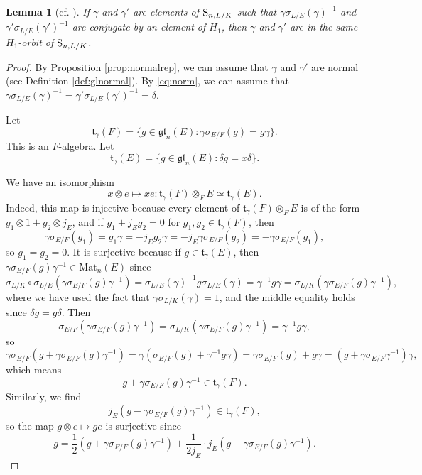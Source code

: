 \documentclass[11pt, reqno]{amsart}
\numberwithin{equation}{subsection}
\theoremstyle{plain}
\newtheorem{lem}[proposition]{Lemma}
\theoremstyle{definition}
\newcommand{\gl}{\mathfrak{gl}}
\renewcommand{\S}{\textnormal{S}}
\begin{document}
\begin{lem}[cf. {\cite[Lemma~1.1(ii)]{Arthur-Clozel}}]
\label{lem:injnorm}
If $\gamma$ and $\gamma'$ are elements of $\S_{n, L/K}$ such that
$\gamma\sigma_{L/E}(\gamma)^{-1}$ and $\gamma'\sigma_{L/E}(\gamma')^{-1}$ are conjugate
by an element of $H_1$, 
then $\gamma$ and $\gamma'$ are in the same $H_1$-orbit
of $\S_{n,L/K}$.
\end{lem}
\begin{proof}

By Proposition \ref{prop:normalrep},
we can assume that $\gamma$ and $\gamma'$ are normal
(see Definition \ref{def:glnormal}).
By \eqref{eq:norm}, 
we can assume that $\gamma\sigma_{L/E}(\gamma)^{-1}
= \gamma'\sigma_{L/E}(\gamma')^{-1} = \delta$.

Let
\[
    \mathfrak t_\gamma(F) = \{g \in \gl_n(E) :
    \gamma \sigma_{E/F}(g) = g\gamma\}.
\]
This is an $F$-algebra. Let 
\[
    \mathfrak t_\gamma(E) = \{g \in \gl_n(E) :
    \delta g = x \delta \}.
\]

We have an isomorphism
\[
    x \otimes e \mapsto xe\colon  \mathfrak t_\gamma(F)
\otimes_F E \simeq \mathfrak t_\gamma(E).
\]
Indeed, this map is injective because every element
of $\mathfrak t_\gamma(F) \otimes_F E$ is of the
form $g_1 \otimes 1 + g_2 \otimes j_E$, and if
$g_1 + j_Eg_2 = 0$ for 
$g_1, g_2 \in \mathfrak t_\gamma(F)$, then
\[
    \gamma\sigma_{E/F}(g_1)
    = g_1\gamma 
    = -j_Eg_2 \gamma
    = -j_E\gamma\sigma_{E/F}(g_2)
    = - \gamma\sigma_{E/F}(g_1),
\]
so $g_1 = g_2 = 0$.
It is surjective because 
if $g \in \mathfrak t_\gamma(E)$, then
$\gamma \sigma_{E/F}(g) \gamma^{-1} \in \mathrm{Mat}_n(E)$
since
\[
    \sigma_{L/K} \circ \sigma_{L/E}(\gamma \sigma_{E/F}(g) \gamma^{-1})
    = \sigma_{L/E}(\gamma)^{-1} g
    \sigma_{L/E}(\gamma) = \gamma^{-1} g \gamma
    = \sigma_{L/K}(\gamma \sigma_{E/F}(g) \gamma^{-1}),
\]
where we have used the fact that 
$\gamma\sigma_{L/K}(\gamma) = 1$,
and the middle equality holds since $\delta g = g\delta$.
Then
\[
   \sigma_{E/F}(\gamma \sigma_{E/F}(g) \gamma^{-1})
   = \sigma_{L/K}(\gamma \sigma_{E/F}(g) \gamma^{-1})
   = \gamma^{-1} g \gamma,
\]
so
\[
    \gamma \sigma_{E/F}(g + \gamma 
    \sigma_{E/F}(g) \gamma^{-1})
    = \gamma(\sigma_{E/F}(g) + \gamma^{-1} g \gamma)
    = \gamma \sigma_{E/F}(g) + g \gamma
    = (g + \gamma \sigma_{E/F} \gamma^{-1})\gamma,
\]
which means
\[
    g + \gamma \sigma_{E/F}(g)\gamma^{-1} \in \mathfrak t_\gamma(F). 
\]
Similarly, we find
\[
    j_E(g - \gamma \sigma_{E/F}(g) \gamma^{-1}) \in
    \mathfrak t_\gamma(F),
\]
so the map $g \otimes e \mapsto ge$ is surjective since
\[
    g = \frac{1}{2}(g + \gamma \sigma_{E/F}(g) \gamma^{-1})
    + \frac{1}{2j_E} \cdot j_E(g - \gamma \sigma_{E/F}(g)\gamma^{-1}).
\]


\end{proof}
\end{document}
